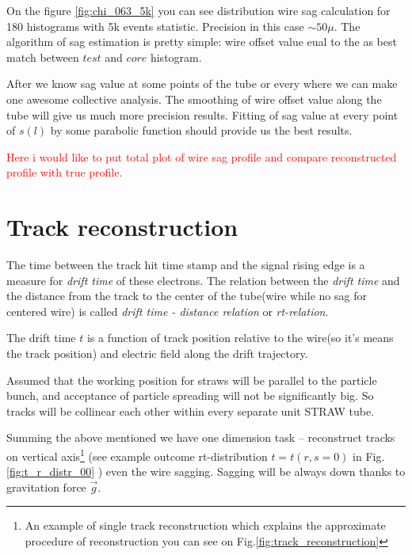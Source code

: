 \documentclass[]{article}
\begin{document}
	
	On the figure \ref{fig:chi_063_5k} you can see distribution wire sag calculation for 180 histograms with 5k events statistic. Precision in this case  $\sim 50\mu$. The algorithm of sag estimation is pretty simple: wire offset value eual to the as best match between $test$ and $core$ histogram.

	After we know sag value at some points of the tube or every where we can make one awesome collective analysis. The smoothing of wire offset value along the tube will give us much more precision results.  Fitting of sag value at  every point of $s(l)$ by some parabolic function should provide us the best results.
	
	\textcolor{red}{ Here i would like to put total plot of wire sag profile and compare reconstructed profile with true profile.}
	
	
	\section{Track reconstruction}
	
	The time between the track hit time stamp and the signal rising edge is a measure for {\it drift time} of these electrons. The relation between the   {\it drift time} and  the distance from the track to the center of the tube(wire while no sag for centered wire) is called {\it drift time - distance relation} or {\it rt-relation}.
	
	The drift time $t$ is a function of track position relative to the wire(so it's means the track position) and electric field along the drift trajectory.
	
	Assumed that the working  position  for straws will be parallel to the particle bunch, and  acceptance of particle spreading will not be significantly big. So tracks will be collinear each other within every separate unit STRAW tube.
	
	Summing the above mentioned we have one dimension task -- reconstruct tracks on vertical axis\footnote{An example of single track reconstruction which explains the approximate procedure of reconstruction you can see on Fig.\ref{fig:track_reconstruction}}
	(see example outcome rt-distribution $t = t(r,s=0)$ in Fig.\ref{fig:t_r_distr_00} ) even the wire sagging. Sagging will be always down thanks to gravitation force $\vec{g}$.
	
\end{document}
